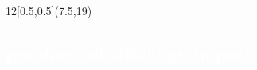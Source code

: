 \begin{frame}
\cleardoublepage
\pagecolor{black}

\begin{textblock}{12}[0.5,0.5](7.5,19)
    \textcolor{white}{
    \part[Import]{problems of stitching: import}
    \label{import}
	}
\end{textblock}

\end{frame}


